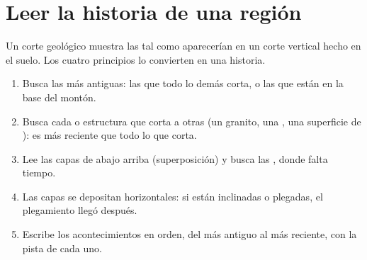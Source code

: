 \section{Leer la historia de una región}

Un corte geológico muestra las  tal como aparecerían en un corte
vertical hecho en el suelo. Los cuatro principios lo convierten en una
historia.

\begin{method}\label{met:g7:geological-time:ordering}
\begin{enumerate}
  \item Busca las  más antiguas: las que todo lo demás corta, o las
        que están en la base del montón.
  \item Busca cada  o estructura que corta a otras (un granito, una
        , una superficie de ): es más reciente que todo lo que
        corta.
  \item Lee las capas de abajo arriba (superposición) y busca las
        , donde falta tiempo.
  \item Las capas se depositan horizontales: si están inclinadas o
        plegadas, el plegamiento llegó después.
  \item Escribe los acontecimientos en orden, del más antiguo al más
        reciente, con la pista de cada uno.
\end{enumerate}
\end{method}

